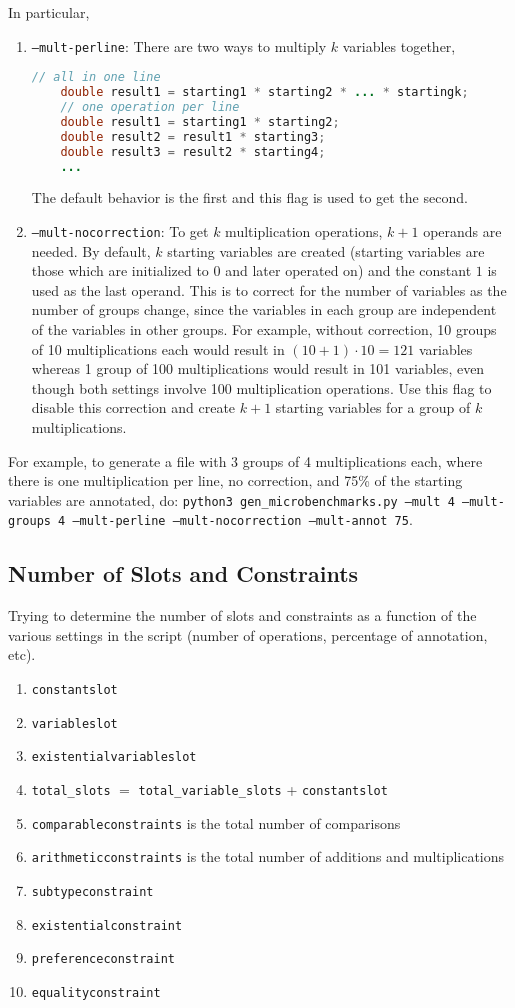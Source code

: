 \documentclass[10pt]{article}
\begin{document}
In particular,
\begin{enumerate}
    \item \texttt{--mult-perline}: There are two ways to multiply $k$ variables together,
    \begin{lstlisting}[language=Java]
    // all in one line
    double result1 = starting1 * starting2 * ... * startingk;
    // one operation per line
    double result1 = starting1 * starting2;
    double result2 = result1 * starting3;
    double result3 = result2 * starting4;
    ...
    \end{lstlisting}
    The default behavior is the first and this flag is used to get the second. 
    \item \texttt{--mult-nocorrection}: To get $k$ multiplication operations, $k + 1$ operands are needed. By default, $k$ starting variables are created (starting variables are those which are initialized to $0$ and later operated on) and the constant $1$ is used as the last operand. This is to correct for the number of variables as the number of groups change, since the variables in each group are independent of the variables in other groups. For example, without correction, 10 groups of 10 multiplications each would result in $(10 + 1)\cdot 10 = 121$ variables whereas 1 group of 100 multiplications would result in 101 variables, even though both settings involve 100 multiplication operations. Use this flag to disable this correction and create $k + 1$ starting variables for a group of $k$ multiplications.
\end{enumerate}
For example, to generate a file with 3 groups of 4 multiplications each, where there is one multiplication per line, no correction, and 75\% of the starting variables are annotated, do: \texttt{\texttt{python3 gen_microbenchmarks.py --mult 4 --mult-groups 4 --mult-perline --mult-nocorrection --mult-annot 75}}. 

\iffalse
\subsection{Number of Slots and Constraints}
Trying to determine the number of slots and constraints as a function of the various settings in the script (number of operations, percentage of annotation, etc). 
\begin{enumerate}
    \item \texttt{constantslot}
    \item \texttt{variableslot}
    \item \texttt{existentialvariableslot}
    \item \texttt{total_slots} $=$ \texttt{total_variable_slots} + \texttt{constantslot}
    \item \texttt{comparableconstraints} is the total number of comparisons
    \item \texttt{arithmeticconstraints} is the total number of additions and multiplications
    \item \texttt{subtypeconstraint}
    \item \texttt{existentialconstraint}
    \item \texttt{preferenceconstraint}
    \item \texttt{equalityconstraint}
\end{enumerate}
\end{document}
